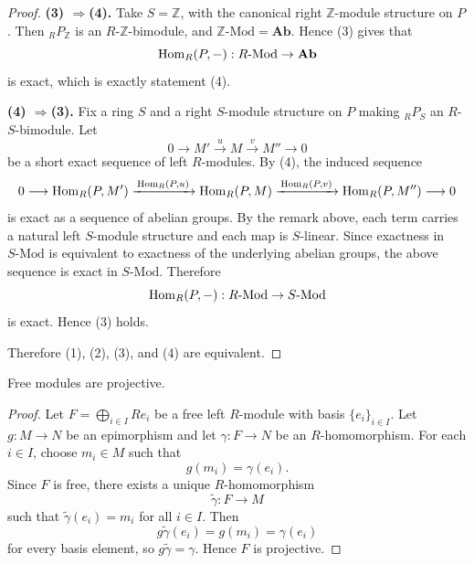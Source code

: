 \begin{proof}
    \medskip
    \noindent\textbf{(3) $\Longrightarrow$(4).}
    Take $S=\mathbb{Z}$, with the canonical right $\mathbb{Z}$-module structure on $P$.
    Then ${}_R P_{\mathbb{Z}}$ is an $R$-$\mathbb{Z}$-bimodule, and $\mathbb{Z}\text{-}\mathrm{Mod}=\mathbf{Ab}$. Hence (3) gives that
    \[
        \mathrm{Hom}_R(P,-):R\text{-}\mathrm{Mod}\to \mathbf{Ab}
    \]
    is exact, which is exactly statement (4).

    \medskip
    \noindent\textbf{(4) $\Longrightarrow$(3).}
    Fix a ring $S$ and a right $S$-module structure on $P$ making ${}_R P_S$ an $R$-$S$-bimodule. Let
    \[
        0\longrightarrow M' \xrightarrow{\,u\,} M \xrightarrow{\,v\,} M'' \longrightarrow 0
    \]
    be a short exact sequence of left $R$-modules. By (4), the induced sequence
    \[
        0\longrightarrow \mathrm{Hom}_R(P,M')
        \xrightarrow{\,\mathrm{Hom}_R(P,u)\,}
        \mathrm{Hom}_R(P,M)
        \xrightarrow{\,\mathrm{Hom}_R(P,v)\,}
        \mathrm{Hom}_R(P,M'')
        \longrightarrow 0
    \]
    is exact as a sequence of abelian groups. By the remark above, each term carries a
    natural left $S$-module structure and each map is $S$-linear. Since exactness in $S\text{-}\mathrm{Mod}$ is equivalent to exactness of the underlying abelian groups,
    the above sequence is exact in $S\text{-}\mathrm{Mod}$. Therefore
    \[
        \mathrm{Hom}_R(P,-):R\text{-}\mathrm{Mod}\to S\text{-}\mathrm{Mod}
    \]
    is exact. Hence (3) holds.

    \medskip
    Therefore \textup{(1)}, \textup{(2)}, \textup{(3)}, and \textup{(4)} are equivalent.
\end{proof}

\begin{proposition}
    Free modules are projective.
\end{proposition}

\begin{proof}
    Let $F=\bigoplus_{i\in I} Re_i$ be a free left $R$-module with basis $\{e_i\}_{i\in I}$.
    Let $g:M\to N$ be an epimorphism and let $\gamma:F\to N$ be an $R$-homomorphism.
    For each $i\in I$, choose $m_i\in M$ such that
    \[
        g(m_i)=\gamma(e_i).
    \]
    Since $F$ is free, there exists a unique $R$-homomorphism
    \[
        \widetilde{\gamma}:F\to M
    \]
    such that $\widetilde{\gamma}(e_i)=m_i$ for all $i\in I$. Then
    \[
        g\widetilde{\gamma}(e_i)=g(m_i)=\gamma(e_i)
    \]
    for every basis element, so $g\widetilde{\gamma}=\gamma$. Hence $F$ is projective.
\end{proof}

